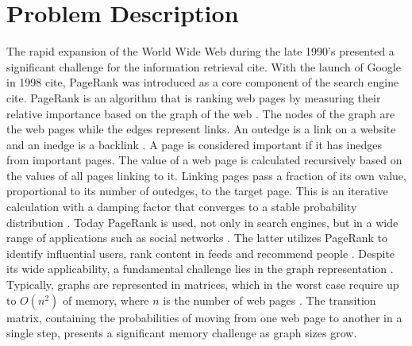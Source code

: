 \documentclass[a4paper,12pt]{article}
\begin{document}
\section{Problem Description}
The rapid expansion of the World Wide Web during the late 1990's presented a significant challenge for the information retrieval cite. With the launch of Google in 1998 cite, PageRank was introduced as a core component of the search engine cite. PageRank is an algorithm that is ranking web pages by measuring their relative importance based on the graph of the web \cite{page_pagerank_1999}. The nodes of the graph are the web pages while the edges represent links. An outedge is a link on a website and an inedge is a backlink \cite{page_pagerank_1999}. A page is considered important if it has inedges from important pages. The value of a web page is calculated recursively based on the values of all pages linking to it. Linking pages pass a fraction of its own value, proportional to its number of outedges, to the target page. This is an iterative calculation with a damping factor that converges to a stable probability distribution \cite{page_pagerank_1999}. 
Today PageRank is used, not only in search engines, but in a wide range of applications such as social networks \cite{wu_efficient_2024}. The latter utilizes PageRank to identify influential users, rank content in feeds and recommend people \cite{weng_twitterrank_2010}. Despite its wide applicability, a fundamental challenge lies in the graph representation \cite{liu_fast_2015}. Typically, graphs are represented in matrices, which in the worst case require up to $O(n^2)$ of memory, where $n$ is the number of web pages \cite{wu_efficient_2024}. The transition matrix, containing the probabilities of moving from one web page to another in a single step, presents a significant memory challenge as graph sizes grow. 
\end{document}
